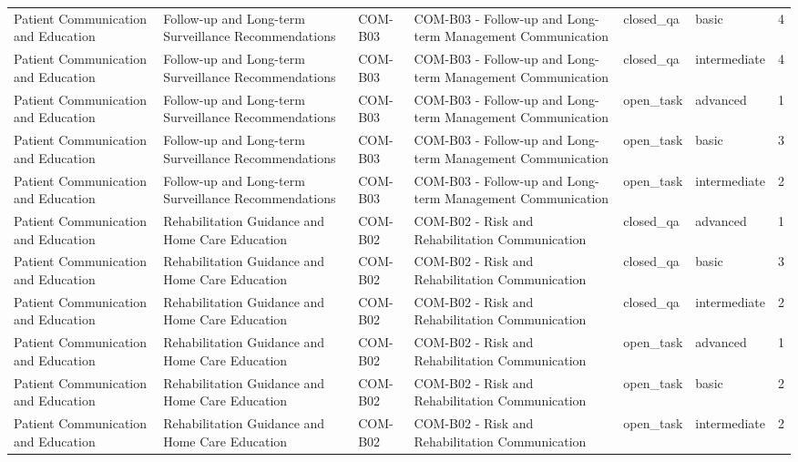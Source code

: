 \begin{tabular}{llllllr}
Patient Communication and Education & Follow-up and Long-term Surveillance Recommendations & COM-B03 & COM-B03 - Follow-up and Long-term Management Communication & closed_qa & basic & 4 \\
Patient Communication and Education & Follow-up and Long-term Surveillance Recommendations & COM-B03 & COM-B03 - Follow-up and Long-term Management Communication & closed_qa & intermediate & 4 \\
Patient Communication and Education & Follow-up and Long-term Surveillance Recommendations & COM-B03 & COM-B03 - Follow-up and Long-term Management Communication & open_task & advanced & 1 \\
Patient Communication and Education & Follow-up and Long-term Surveillance Recommendations & COM-B03 & COM-B03 - Follow-up and Long-term Management Communication & open_task & basic & 3 \\
Patient Communication and Education & Follow-up and Long-term Surveillance Recommendations & COM-B03 & COM-B03 - Follow-up and Long-term Management Communication & open_task & intermediate & 2 \\
Patient Communication and Education & Rehabilitation Guidance and Home Care Education & COM-B02 & COM-B02 - Risk and Rehabilitation Communication & closed_qa & advanced & 1 \\
Patient Communication and Education & Rehabilitation Guidance and Home Care Education & COM-B02 & COM-B02 - Risk and Rehabilitation Communication & closed_qa & basic & 3 \\
Patient Communication and Education & Rehabilitation Guidance and Home Care Education & COM-B02 & COM-B02 - Risk and Rehabilitation Communication & closed_qa & intermediate & 2 \\
Patient Communication and Education & Rehabilitation Guidance and Home Care Education & COM-B02 & COM-B02 - Risk and Rehabilitation Communication & open_task & advanced & 1 \\
Patient Communication and Education & Rehabilitation Guidance and Home Care Education & COM-B02 & COM-B02 - Risk and Rehabilitation Communication & open_task & basic & 2 \\
Patient Communication and Education & Rehabilitation Guidance and Home Care Education & COM-B02 & COM-B02 - Risk and Rehabilitation Communication & open_task & intermediate & 2 \\
\bottomrule
\end{tabular}
